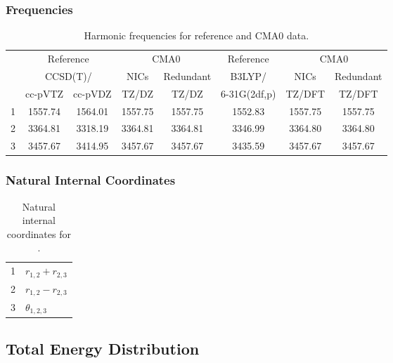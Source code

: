\documentclass[10pt,oneside]{article}
\begin{document}
\begin{table}[h!]
\subsubsection*{Frequencies}
\centering
\caption{Harmonic frequencies for reference and CMA0 data.}
\begin{tabular}{cccccccc}
\toprule
{} & \multicolumn{2}{c}{Reference} & \multicolumn{2}{c}{CMA0} &    Reference & \multicolumn{2}{c}{CMA0} \\
{} & \multicolumn{2}{c}{CCSD(T)/} &    NICs &  Redundant &       B3LYP/ &    NICs & Redundant \\
{} &   cc-pVTZ & cc-pVDZ &   TZ/DZ &      TZ/DZ & 6-31G(2df,p) &  TZ/DFT &    TZ/DFT \\
\midrule
1 &   1557.74 & 1564.01 & 1557.75 &    1557.75 &      1552.83 & 1557.75 &   1557.75 \\
2 &   3364.81 & 3318.19 & 3364.81 &    3364.81 &      3346.99 & 3364.80 &   3364.80 \\
3 &   3457.67 & 3414.95 & 3457.67 &    3457.67 &      3435.59 & 3457.67 &   3457.67 \\
\bottomrule
\end{tabular}
\end{table}

\begin{table}[h!]
\subsubsection*{Natural Internal Coordinates}
\centering
\caption{Natural internal coordinates for .}
\small
\begin{tabular}{ll}
\toprule
  1   & $r_{1,2} + r_{2,3}$ \\
  2   & $r_{1,2} - r_{2,3}$ \\
  3   & $\theta_{1,2,3}$ \\
\bottomrule
\end{tabular}
\end{table}

\begin{table}
\subsection*{Total Energy Distribution}
\centering\end{table}

\clearpage

\subsection{}
\end{document}
